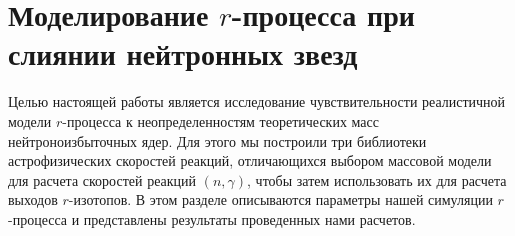 \section{Моделирование $r$-процесса при слиянии нейтронных звезд} \label{skynet}
Целью настоящей работы является исследование чувствительности реалистичной модели $r$-процесса к неопределенностям теоретических масс нейтроноизбыточных ядер. Для этого мы построили три библиотеки астрофизических скоростей реакций, отличающихся выбором массовой модели для расчета скоростей реакций $(n,\gamma)$, чтобы затем использовать их для расчета выходов $r$-изотопов. В этом разделе описываются параметры нашей симуляции $r$-процесса и представлены результаты проведенных нами расчетов.



